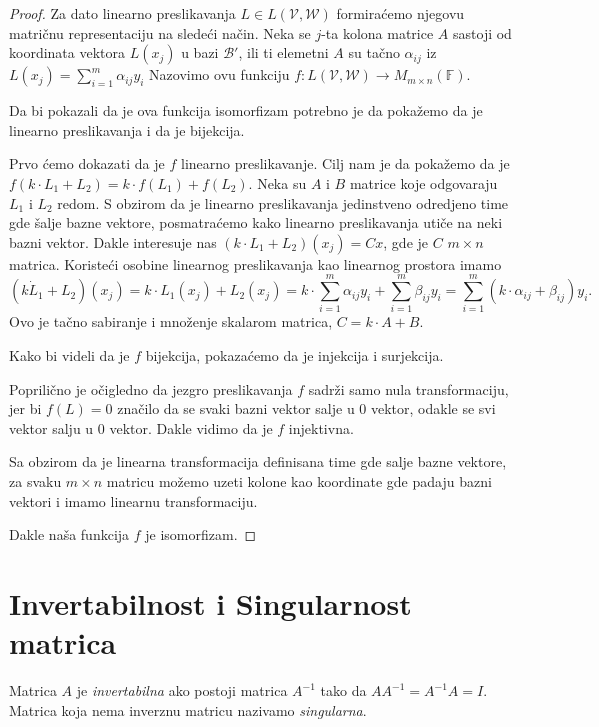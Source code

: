 \documentclass{article}
\begin{document}
\begin{proof}
  Za dato linearno preslikavanja $L \in L(\mathcal{V}, \mathcal{W})$ formiraćemo njegovu matričnu representaciju na sledeći način.
  Neka se $j$-ta kolona matrice $A$ sastoji od koordinata vektora $L(x_j)$ u bazi $\mathcal{B}'$, ili ti elemetni $A$ su tačno $\alpha_{ij}$ iz $L(x_j) = \sum_{i = 1}^{m} \alpha_{ij} y_i$
  Nazovimo ovu funkciju $f : L(\mathcal{V}, \mathcal{W}) \to M_{m \times n} (\mathbb{F})$.

  Da bi pokazali da je ova funkcija isomorfizam potrebno je da pokažemo da je linearno preslikavanja i da je bijekcija.
  
  Prvo ćemo dokazati da je $f$ linearno preslikavanje.
  Cilj nam je da pokažemo da je $f(k \cdot L_1 + L_2) = k \cdot f(L_1) + f(L_2)$.
  Neka su $A$ i $B$ matrice koje odgovaraju $L_1$ i $L_2$ redom.
  S obzirom da je linearno preslikavanja jedinstveno odredjeno time gde šalje bazne vektore, posmatraćemo kako linearno preslikavanja utiče na neki bazni vektor.
  Dakle interesuje nas $(k \cdot L_1 + L_2)(x_j) = Cx$, gde je $C$ $m \times n$ matrica.
  Koristeći osobine linearnog preslikavanja kao linearnog prostora imamo
  \[(k \dot L_1 + L_2)(x_j) = k \cdot L_1(x_j) + L_2(x_j) = k \cdot \sum_{i = 1}^{m} \alpha_{ij} y_i + \sum_{i = 1}^{m} \beta_{ij} y_i = \sum_{i = 1}^{m} (k \cdot \alpha_{ij} + \beta_{ij}) y_i.\]
  Ovo je tačno sabiranje i množenje skalarom matrica, $C = k \cdot A + B$.
  

  Kako bi videli da je $f$ bijekcija, pokazaćemo da je injekcija i surjekcija.

  Poprilično je očigledno da jezgro preslikavanja $f$ sadrži samo nula transformaciju, jer bi $f(L) = 0$ značilo da se svaki bazni vektor salje u $0$ vektor, odakle se svi vektor salju u $0$ vektor.
  Dakle vidimo da je $f$ injektivna.

  Sa obzirom da je linearna transformacija definisana time gde salje bazne vektore, za svaku $m \times n$ matricu možemo uzeti kolone kao koordinate gde padaju bazni vektori i imamo linearnu transformaciju.

  Dakle naša funkcija $f$ je isomorfizam.
\end{proof}

\section{Invertabilnost i Singularnost matrica}

\begin{definition}[Invertabilnost]
  Matrica $A$ je \textit{invertabilna} ako postoji matrica $A^{-1}$ tako da $AA^{-1} = A^{-1}A = I$.
  Matrica koja nema inverznu matricu nazivamo \textit{singularna}.
\end{definition}
\end{document}
